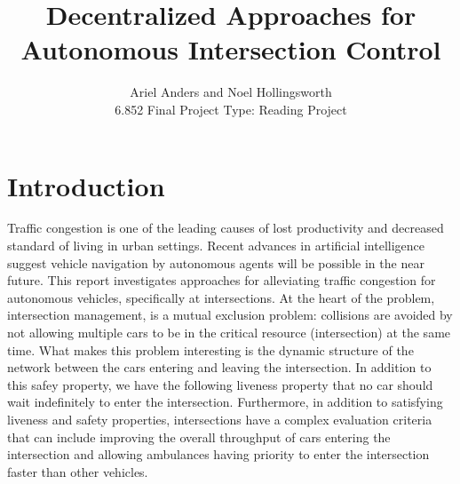 \documentclass[12pt]{article}
\title{Decentralized Approaches for Autonomous Intersection Control }
\author{Ariel Anders and Noel Hollingsworth\\ 6.852 Final Project Type: Reading Project}
\begin{document}
\maketitle 

\pagebreak
\tableofcontents
\pagebreak

\section{Introduction}

Traffic congestion is one of the leading causes of lost productivity and decreased standard of living in urban settings. Recent advances in artificial intelligence suggest vehicle navigation by autonomous agents will be possible in the near future.\cite{dresner}  
This report investigates approaches for alleviating traffic congestion for autonomous vehicles, specifically at intersections. At the heart of the problem, intersection management, is a mutual exclusion problem: collisions are avoided by not allowing multiple cars to be in the critical resource (intersection) at the same time.  What makes this problem interesting is the dynamic structure of the network between the cars entering and leaving the intersection.  In addition to this safey property, we have the following liveness property that no car should wait indefinitely to enter the intersection.  Furthermore, in addition to satisfying liveness and safety properties, intersections have a complex evaluation criteria that can include improving the overall throughput of cars entering the intersection and allowing ambulances having priority to enter the intersection faster than other vehicles.
\end{document}
